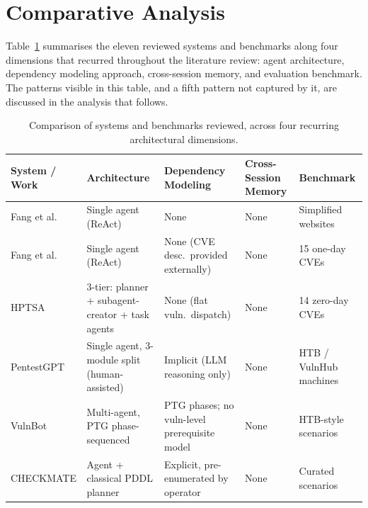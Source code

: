 \section{Comparative Analysis}
\label{sec_comparative_analysis}

Table~\ref{tab:vapt-comparison} summarises the eleven reviewed systems and benchmarks along four dimensions that recurred throughout the literature review: agent architecture, dependency modeling approach, cross-session memory, and evaluation benchmark. The patterns visible in this table, and a fifth pattern not captured by it, are discussed in the analysis that follows.

\begin{table}[h!]
	\centering
	\small
	\caption{Comparison of systems and benchmarks reviewed, across four recurring architectural dimensions.}
	\label{tab:vapt-comparison}
	\begin{tabular}{p{2.7cm}p{2.8cm}p{2.8cm}p{1.8cm}p{2.4cm}}
		\toprule
		\textbf{System / Work}                    & \textbf{Architecture}                            & \textbf{Dependency Modeling}                 & \textbf{Cross-Session Memory} & \textbf{Benchmark}      \\
		\midrule
		Fang et al.\ \citep{fang2024hackwebsites} & Single agent (ReAct)                             & None                                         & None                          & Simplified websites     \\
		Fang et al.\ \citep{fang2024oneday}       & Single agent (ReAct)                             & None (CVE desc.\ provided externally)        & None                          & 15 one-day CVEs         \\
		HPTSA \citep{zhu2024hptsa}                & 3-tier: planner + subagent-creator + task agents & None (flat vuln.\ dispatch)                  & None                          & 14 zero-day CVEs        \\
		PentestGPT \citep{deng2024pentestgpt}     & Single agent, 3-module split (human-assisted)    & Implicit (LLM reasoning only)                & None                          & HTB / VulnHub machines  \\
		VulnBot \citep{kong2025vulnbot}           & Multi-agent, PTG phase-sequenced                 & PTG phases; no vuln-level prerequisite model & None                          & HTB-style scenarios     \\
		CHECKMATE \citep{wang2025checkmate}       & Agent + classical PDDL planner                   & Explicit, pre-enumerated by operator         & None                          & Curated scenarios       \\

\end{tabular}
\end{table}
